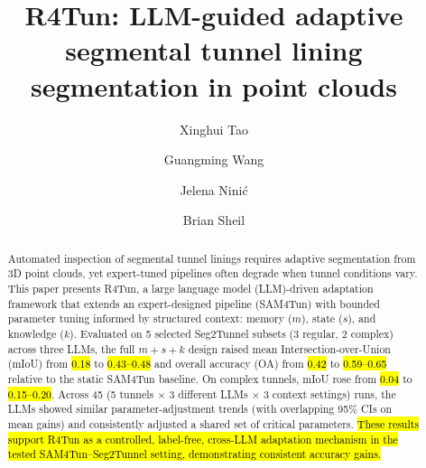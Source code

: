 \documentclass[a4paper,fleqn]{cas-dc}
\begin{document}
\let\WriteBookmarks\relax
\def\floatpagepagefraction{1}
\def\textpagefraction{.001}




{

\title[mode=title]{R4Tun: LLM-guided adaptive segmental tunnel lining segmentation in point clouds}

\author[1]{Xinghui Tao}

\author[1]{Guangming Wang}
\cormark[1]

\author[2]{Jelena Nini\'{c}}

\author[1]{Brian Sheil}






\begin{abstract}
Automated inspection of segmental tunnel linings requires adaptive segmentation from 3D point clouds, yet expert-tuned pipelines often degrade when tunnel conditions vary. This paper presents R4Tun, a large language model (LLM)-driven adaptation framework that extends an expert-designed pipeline (SAM4Tun) with bounded parameter tuning informed by structured context: memory ($m$), state ($s$), and knowledge ($k$). Evaluated on 5 selected Seg2Tunnel subsets (3 regular, 2 complex) across three LLMs, the full $m+s+k$ design raised mean Intersection-over-Union (mIoU) from \hl{0.18} to \hl{0.43--0.48} and overall accuracy (OA) from \hl{0.42} to \hl{0.59--0.65} relative to the static SAM4Tun baseline. On complex tunnels, mIoU rose from \hl{0.04} to \hl{0.15--0.20}. Across 45 (5 tunnels $\times$ 3 different LLMs $\times$ 3 context settings) runs, the LLMs showed similar parameter-adjustment trends (with overlapping 95\% CIs on mean gains) and consistently adjusted a shared set of critical parameters. \hl{These results support R4Tun as a controlled, label-free, cross-LLM adaptation mechanism in the tested SAM4Tun--Seg2Tunnel setting, demonstrating consistent accuracy gains.}
\end{abstract}


}
\end{document}
